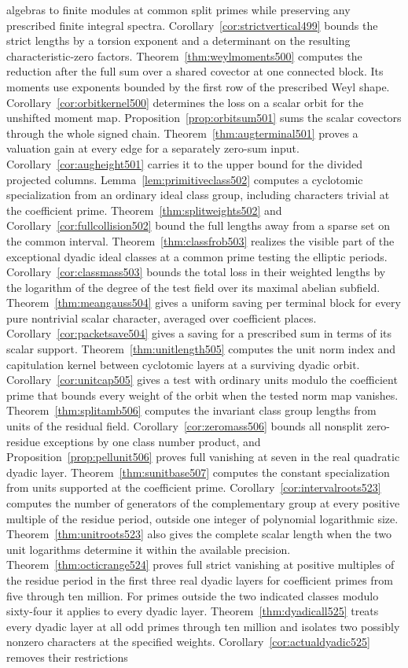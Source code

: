 \documentclass[a4paper,11pt]{article}
\theoremstyle{definition}
\theoremstyle{remark}
\numberwithin{equation}{section}
\begin{document}
algebras to finite modules at common split primes while preserving any prescribed finite integral spectra. Corollary~\ref{cor:strictvertical499} bounds the strict lengths by a torsion exponent and a determinant on the resulting characteristic-zero factors. Theorem~\ref{thm:weylmoments500} computes the reduction after the full sum over a shared covector at one connected block. Its moments use exponents bounded by the first row of the prescribed Weyl shape. Corollary~\ref{cor:orbitkernel500} determines the loss on a scalar orbit for the unshifted moment map. Proposition~\ref{prop:orbitsum501} sums the scalar covectors through the whole signed chain. Theorem~\ref{thm:augterminal501} proves a valuation gain at every edge for a separately zero-sum input. Corollary~\ref{cor:augheight501} carries it to the upper bound for the divided projected columns. Lemma~\ref{lem:primitiveclass502} computes a cyclotomic specialization from an ordinary ideal class group, including characters trivial at the coefficient prime. Theorem~\ref{thm:splitweights502} and Corollary~\ref{cor:fullcollision502} bound the full lengths away from a sparse set on the common interval. Theorem~\ref{thm:classfrob503} realizes the visible part of the exceptional dyadic ideal classes at a common prime testing the elliptic periods. Corollary~\ref{cor:classmass503} bounds the total loss in their weighted lengths by the logarithm of the degree of the test field over its maximal abelian subfield. Theorem~\ref{thm:meangauss504} gives a uniform saving per terminal block for every pure nontrivial scalar character, averaged over coefficient places. Corollary~\ref{cor:packetsave504} gives a saving for a prescribed sum in terms of its scalar support. Theorem~\ref{thm:unitlength505} computes the unit norm index and capitulation kernel between cyclotomic layers at a surviving dyadic orbit. Corollary~\ref{cor:unitcap505} gives a test with ordinary units modulo the coefficient prime that bounds every weight of the orbit when the tested norm map vanishes. Theorem~\ref{thm:splitamb506} computes the invariant class group lengths from units of the residual field. Corollary~\ref{cor:zeromass506} bounds all nonsplit zero-residue exceptions by one class number product, and Proposition~\ref{prop:pellunit506} proves full vanishing at seven in the real quadratic dyadic layer. Theorem~\ref{thm:sunitbase507} computes the constant specialization from units supported at the coefficient prime. Corollary~\ref{cor:intervalroots523} computes the number of generators of the complementary group at every positive multiple of the residue period, outside one integer of polynomial logarithmic size. Theorem~\ref{thm:unitroots523} also gives the complete scalar length when the two unit logarithms determine it within the available precision. Theorem~\ref{thm:octicrange524} proves full strict vanishing at positive multiples of the residue period in the first three real dyadic layers for coefficient primes from five through ten million. For primes outside the two indicated classes modulo sixty-four it applies to every dyadic layer. Theorem~\ref{thm:dyadicall525} treats every dyadic layer at all odd primes through ten million and isolates two possibly nonzero characters at the specified weights. Corollary~\ref{cor:actualdyadic525} removes their restrictions 
\end{document}
